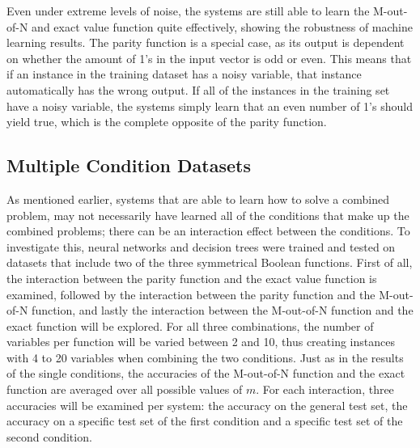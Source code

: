 \documentclass[letterpaper]{article} %
\begin{document}
Even under extreme levels of noise, the systems are still able to learn the M-out-of-N and exact value function quite effectively, showing the robustness of machine learning results. The parity function is a special case, as its output is dependent on whether the amount of 1's in the input vector is odd or even. This means that if an instance in the training dataset has a noisy variable, that instance automatically has the wrong output. If all of the instances in the training set have a noisy variable, the systems simply learn that an even number of 1's should yield true, which is the complete opposite of the parity function.%

\subsection{Multiple Condition Datasets}
As mentioned earlier, systems that are able to learn how to solve a combined problem, may not necessarily have learned all of the conditions that make up the combined problems; there can be an interaction effect between the conditions. To investigate this, neural networks and decision trees were trained and tested on datasets that include two of the three symmetrical Boolean functions. First of all, the interaction between the parity function and the exact value function is examined, followed by the interaction between the parity function and the M-out-of-N function, and lastly the interaction between the M-out-of-N function and the exact function will be explored. For all three combinations, the number of variables per function will be varied between 2 and 10, thus creating instances with 4 to 20 variables when combining the two conditions.  Just as in the results of the single conditions, the accuracies of the M-out-of-N function and the exact function are averaged over all possible values of $m$. For each interaction, three accuracies will be examined per system: the accuracy on the general test set, the accuracy on a specific test set of the first condition and a specific test set of the second condition.

\begin{table}[h!]
\centering
\caption{The mean accuracies of the decision tree on each test set after training on each interaction.}
\label{tbl:interactions_DT}
\end{table}
\end{document}

